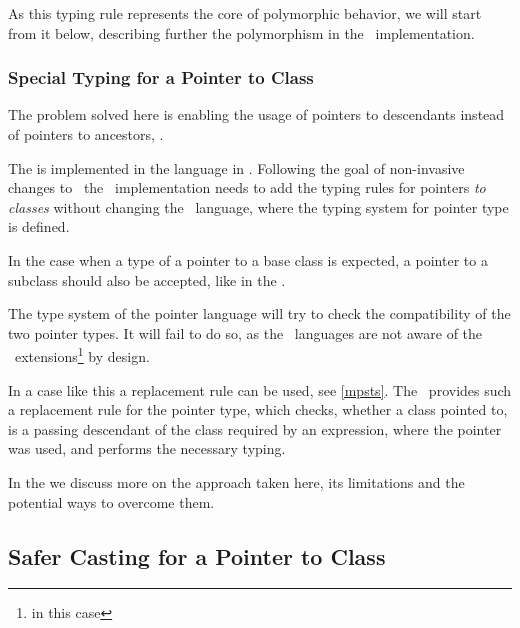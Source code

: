 As this typing rule represents the core of polymorphic behavior, we will start from it below, describing further the
polymorphism in the \pcpp\ implementation.

\subsubsection{Special Typing for a Pointer to Class}
\label{pointertoclasstyping}

The problem solved here is enabling the usage of pointers to descendants instead of pointers to ancestors,
.


The   is implemented in the  language in \mbdr. 
Following the goal of non-invasive changes to \mbeddr\ the \pcpp\ implementation needs to add the 
typing rules for pointers \emph{to classes} without changing the    \mbdr\ language, where the 
typing system for pointer type is defined.

In the case when a type of a pointer to a base class is expected, a pointer to a subclass should also be accepted, like
in the .

The type system of the pointer language will try to check the compatibility of the two pointer types. It will
fail to do so, as the \mbdr\ languages are not aware of the \pcpp\ extensions\footnote{  in this case} 
by design.


In a case like this a replacement rule can be used, see \ref{mpsts}. The \pcpp\ provides such a replacement rule for the 
pointer type, which checks, whether a class pointed to, is a passing descendant of the class required by an expression, 
where the pointer was used, and performs the necessary typing.

In the  we discuss more on the approach taken here, its limitations and 
the potential ways to overcome them.

\subsection{Safer Casting for a Pointer to Class}
\label{safecasting}

\cppproblem

